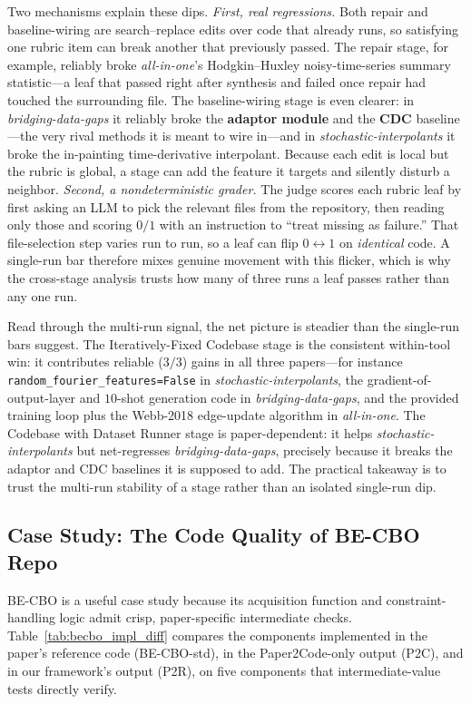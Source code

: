 \documentclass[11pt]{article}
\begin{document}
Two mechanisms explain these dips. \emph{First, real regressions.}
Both repair and baseline-wiring are search--replace edits over code
that already runs, so satisfying one rubric item can break another
that previously passed. The repair stage, for example, reliably broke
\emph{all-in-one}'s Hodgkin--Huxley noisy-time-series summary
statistic---a leaf that passed right after synthesis and failed once
repair had touched the surrounding file. The baseline-wiring stage is
even clearer: in \emph{bridging-data-gaps} it reliably broke the
\textbf{adaptor module} and the \textbf{CDC} baseline---the very rival
methods it is meant to wire in---and in \emph{stochastic-interpolants}
it broke the in-painting time-derivative interpolant. Because each
edit is local but the rubric is global, a stage can add the feature it
targets and silently disturb a neighbor. \emph{Second, a
nondeterministic grader.} The judge scores each rubric leaf by first
asking an LLM to pick the relevant files from the repository, then
reading only those and scoring $0/1$ with an instruction to ``treat
missing as failure.'' That file-selection step varies run to run, so a
leaf can flip $0\leftrightarrow1$ on \emph{identical} code. A
single-run bar therefore mixes genuine movement with this flicker,
which is why the cross-stage analysis trusts how many of three runs a
leaf passes rather than any one run.

Read through the multi-run signal, the net picture is steadier than
the single-run bars suggest. The Iteratively-Fixed Codebase stage is
the consistent within-tool win: it contributes reliable
($3\text{/}3$) gains in all three papers---for instance
\texttt{random\_fourier\_features=False} in
\emph{stochastic-interpolants}, the gradient-of-output-layer and
$10$-shot generation code in \emph{bridging-data-gaps}, and the
provided training loop plus the Webb-2018 edge-update algorithm in
\emph{all-in-one}. The Codebase with Dataset Runner stage is
paper-dependent: it helps \emph{stochastic-interpolants} but
net-regresses \emph{bridging-data-gaps}, precisely because it breaks
the adaptor and CDC baselines it is supposed to add. The practical
takeaway is to trust the multi-run stability of a stage rather than an
isolated single-run dip.

\subsection{Case Study: The Code Quality of BE-CBO Repo }

BE-CBO is a useful case study because its acquisition function
and constraint-handling logic admit crisp, paper-specific
intermediate checks. Table~\ref{tab:becbo_impl_diff} compares
the components implemented in the paper's reference code
(BE-CBO-std), in the Paper2Code-only output (P2C), and in our
framework's output (P2R), on five components that
intermediate-value tests directly verify.
\end{document}
